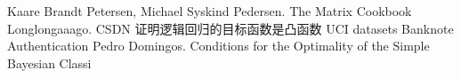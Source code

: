 \begin{thebibliography}{99}
    Kaare Brandt Petersen, Michael Syskind Pedersen. The Matrix Cookbook
    Longlongaaago. CSDN 证明逻辑回归的目标函数是凸函数
    UCI datasets Banknote Authentication
    Pedro Domingos. Conditions for the Optimality of the Simple Bayesian Classi
\end{thebibliography}
